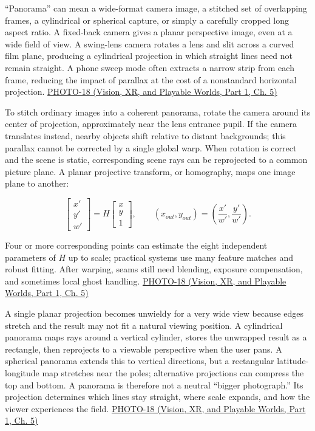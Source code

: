 \hypertarget{03-visual-computing-i-ch003-panoramas-geometry-before-stitching}{}

``Panorama'' can mean a wide-format camera image, a stitched set of overlapping frames, a cylindrical or spherical capture, or simply a carefully cropped long aspect ratio. A fixed-back camera gives a planar perspective image, even at a wide field of view. A swing-lens camera rotates a lens and slit across a curved film plane, producing a cylindrical projection in which straight lines need not remain straight. A phone sweep mode often extracts a narrow strip from each frame, reducing the impact of parallax at the cost of a nonstandard horizontal projection. \href{../07-Vision-XR-and-Playable-Worlds-P01/main.pdf\#nameddest=04-visual-computing-ii-ch036-photo-18---photography-session-18}{PHOTO-18 (Vision, XR, and Playable Worlds, Part 1, Ch. 5)}

To stitch ordinary images into a coherent panorama, rotate the camera around its center of projection, approximately near the lens entrance pupil. If the camera translates instead, nearby objects shift relative to distant backgrounds; this parallax cannot be corrected by a single global warp. When rotation is correct and the scene is static, corresponding scene rays can be reprojected to a common picture plane. A planar projective transform, or homography, maps one image plane to another:

\[
\begin{bmatrix}x'\\y'\\w'\end{bmatrix}
=H\begin{bmatrix}x\\y\\1\end{bmatrix},\qquad
(x_{out},y_{out})=\left(\frac{x'}{w'},\frac{y'}{w'}\right).
\]

Four or more corresponding points can estimate the eight independent parameters of \(H\) up to scale; practical systems use many feature matches and robust fitting. After warping, seams still need blending, exposure compensation, and sometimes local ghost handling. \href{../07-Vision-XR-and-Playable-Worlds-P01/main.pdf\#nameddest=04-visual-computing-ii-ch036-photo-18---photography-session-18}{PHOTO-18 (Vision, XR, and Playable Worlds, Part 1, Ch. 5)}

A single planar projection becomes unwieldy for a very wide view because edges stretch and the result may not fit a natural viewing position. A cylindrical panorama maps rays around a vertical cylinder, stores the unwrapped result as a rectangle, then reprojects to a viewable perspective when the user pans. A spherical panorama extends this to vertical directions, but a rectangular latitude-longitude map stretches near the poles; alternative projections can compress the top and bottom. A panorama is therefore not a neutral ``bigger photograph.'' Its projection determines which lines stay straight, where scale expands, and how the viewer experiences the field. \href{../07-Vision-XR-and-Playable-Worlds-P01/main.pdf\#nameddest=04-visual-computing-ii-ch036-photo-18---photography-session-18}{PHOTO-18 (Vision, XR, and Playable Worlds, Part 1, Ch. 5)}

